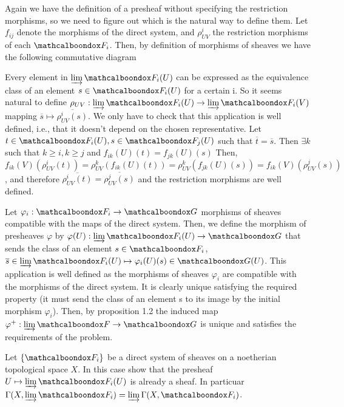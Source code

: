 \begin{sol}
	Again we have the definition of a presheaf without specifying the restriction morphisms, so we need to figure out which is the natural way to define them. Let $f_{ij}$ denote the morphisms of the direct system, and $\rho^i_{UV}$ the restriction morphisms of each $\sF_i$. Then, by definition of morphisms of sheaves we have the following commutative diagram

	Every element in $\varinjlim \sF_i(U)$ can be expressed as the equivalence class of an element $s \in \sF_i(U)$ for a certain i. So it seems natural to define $\rho_{UV}: \varinjlim \sF_i(U) \to \varinjlim \sF_i(V)$ mapping $\overline{s} \mapsto \overline{\rho^i_{UV}(s)}$. We only have to check that this application is well defined, i.e., that it doesn't depend on the chosen representative. Let $t \in \sF_i(U), s \in \sF_j(U)$ such that $\overline{t} = \overline{s}$. Then $\exists k$ such that $k \geq i, k \geq j$ and $f_{ik}(U)(t) = f_{jk}(U)(s)$ Then, $f_{ik}(V)(\rho_{UV}^i(t)) = \rho^k_{UV}(f_{ik}(U)(t)) = \rho_{UV}^k(f_{jk}(U)(s)) = f_{ik}(V)(\rho^j_{UV}(s))$, and therefore $\overline{\rho^i_{UV}(t)} = \overline{\rho^j_{UV}(s)}$ and the restriction morphisms are well defined.

	Let $\varphi_i: \sF_i \to \sG$ morphisms of sheaves compatible with the maps of the direct system. Then, we define the morphism of presheaves $\varphi$ by $\varphi(U): \varinjlim \sF_i(U) \to \sG$ that sends the class of an element $s \in \sF_i$, $\overline{s} \in \varinjlim \sF_i(U) \mapsto \varphi_i(U)(s) \in \sG(U)$. This application is well defined as the morphisms of sheaves $\varphi_i$ are compatible with the morphisms of the direct system. It is clearly unique satisfying the required property (it must send the class of an element s to its image by the initial morphism $\varphi_i$). Then, by proposition 1.2 the induced map $\varphi^{+}: \varinjlim \sF \to \sG$ is unique and satisfies the requirements of the problem.
\end{sol}

\begin{ex}
	Let $\{\sF_i\}$ be a direct system of sheaves on a noetherian topological space $X$. In this case show that the presheaf $U \mapsto \varinjlim \sF_i(U)$ is already a sheaf. In particuar $\Gamma(X, \varinjlim \sF_i) = \varinjlim \Gamma(X,\sF_i)$.
\end{ex}

